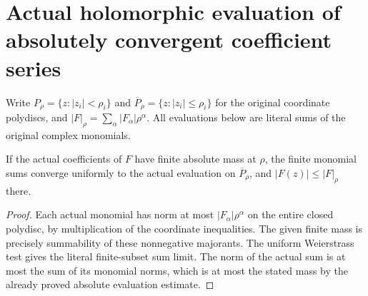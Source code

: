 \section{Actual holomorphic evaluation of absolutely convergent coefficient series}

Write $P_\rho=\{z:|z_i|<\rho_i\}$ and
$\overline P_\rho=\{z:|z_i|\leq\rho_i\}$ for the original coordinate
polydiscs, and $|F|_\rho=\sum_\alpha|F_\alpha|\rho^\alpha$.
All evaluations below are literal sums of the original complex monomials.

\begin{theorem}
\label{hir:actual-coefficient-polydisc-uniform-evaluation}
If the actual coefficients of $F$ have finite absolute mass at $\rho$,
the finite monomial sums converge uniformly to the actual evaluation on
$\overline P_\rho$, and $|F(z)|\leq|F|_\rho$ there.
\leanok
\end{theorem}
\begin{proof}
Each actual monomial has norm at most $|F_\alpha|\rho^\alpha$
on the entire closed polydisc, by multiplication of the coordinate
inequalities. The given finite mass is precisely summability of these
nonnegative majorants. The uniform Weierstrass test gives the literal
finite-subset sum limit. The norm of the actual sum is at most the sum
of its monomial norms, which is at most the stated mass by the already
proved absolute evaluation estimate.
\end{proof}


